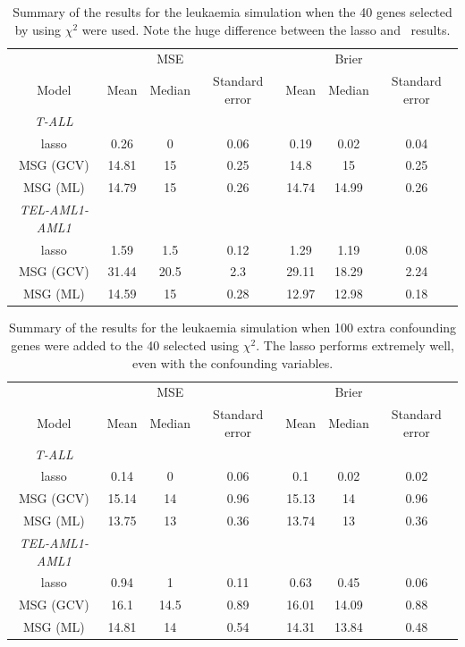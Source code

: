 \begin{table}  
\begin{centering}
\begin{tabular}{c || ccc | ccc}
    &  & MSE &  &  & Brier & \\ 
    Model & Mean & Median & Standard error & Mean & Median & Standard error \\
    \hline
 \textit{T-ALL} & & & & & & \\
lasso &  0.26 & 0 & 0.06 & 0.19 & 0.02 & 0.04 \\
MSG (GCV) & 14.81 & 15 & 0.25 & 14.8 & 15 & 0.25 \\
MSG (ML) &  14.79 & 15 & 0.26 & 14.74 & 14.99 & 0.26 \\
\textit{TEL-AML1-AML1}  & & &  & & & \\
lasso &  1.59 & 1.5 & 0.12 & 1.29 & 1.19 & 0.08 \\
MSG (GCV) & 31.44 & 20.5 & 2.3 & 29.11 & 18.29 & 2.24 \\
MSG (ML) &  14.59 & 15 & 0.28 & 12.97 & 12.98 & 0.18 \\
  \end{tabular}
\caption{Summary of the results for the leukaemia simulation when the 40 genes selected by  using $\chi^2$ were used. Note the huge difference between the lasso and \mdsds\ results.}
\end{centering}
\label{leuk-sim}
\end{table}


\begin{table}  
\begin{centering}
\begin{tabular}{c || ccc | ccc}
    &  & MSE &  &  & Brier & \\ 
    Model & Mean & Median & Standard error & Mean & Median & Standard error \\
    \hline
\textit{T-ALL}  & & & & & & \\
lasso &  0.14 & 0 & 0.06 & 0.1 & 0.02 & 0.02 \\
MSG (GCV) & 15.14 & 14 & 0.96 & 15.13 & 14 & 0.96 \\
MSG (ML) &  13.75 & 13 & 0.36 & 13.74 & 13 & 0.36 \\
\textit{TEL-AML1-AML1}  & & & & & & \\
lasso &  0.94 & 1 & 0.11 & 0.63 & 0.45 & 0.06 \\
MSG (GCV) & 16.1 & 14.5 & 0.89 & 16.01 & 14.09 & 0.88 \\
MSG (ML) &  14.81 & 14 & 0.54 & 14.31 & 13.84 & 0.48 \\
  \end{tabular}
\caption{Summary of the results for the leukaemia simulation when 100 extra confounding genes were added to the 40 selected using $\chi^2$. The lasso performs extremely well, even with the confounding variables.}
\end{centering}
\label{leuk-confsim}
\end{table}


